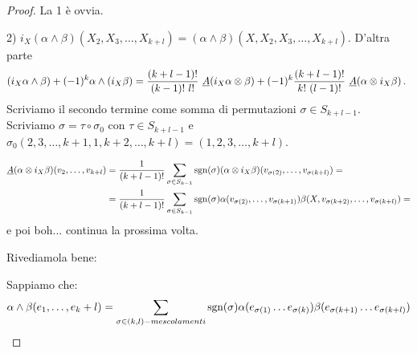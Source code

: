\begin{proof}
	La 1 è ovvia.
	
	2) $i_X(\alpha \wedge \beta) (X_2,X_3,\ldots,X_{k+l}) = (\alpha\wedge\beta) (X, X_2,X_3,\ldots,X_{k+l})$.
	D'altra parte
	\begin{equation*}
	(i_X\alpha\wedge \beta) + (-1)^k \alpha \wedge (i_X\beta) = \frac{(k+l-1)!}{(k-1)!\ l!}\ \antisimm (i_X\alpha \otimes \beta) + (-1)^k \frac{(k+l-1)!}{k!\ (l-1)!} \ \antisimm (\alpha \otimes i_X\beta) \punto
	\end{equation*}
	Scriviamo il secondo termine come somma di permutazioni $\sigma \in S_{k+l-1}$. Scriviamo $\sigma = \tau \circ \sigma_0$ con $\tau \in S_{k+l-1}$ e $\sigma_0(2,3,\ldots, k+1, 1, k+2, \ldots, k+l) = (1,2,3,\ldots, k+l)$.
	
	\begin{align*}
		\antisimm (\alpha \otimes i_X\beta) (v_2,\ldots,v_{k+l}) &= \frac 1{(k+l-1)!} \sum_{\sigma\in S_{k-1}}\sgn(\sigma) (\alpha \otimes i_X\beta) (v_{\sigma(2)},\ldots,v_{\sigma(k+l)})=\\
		&= \frac 1{(k+l-1)!} \sum_{\sigma\in S_{k-1}}\sgn(\sigma) \alpha(v_{\sigma(2)},\ldots,v_{\sigma(k+1)})\beta(X,v_{\sigma(k+2)},\ldots,v_{\sigma(k+l)})=
	\end{align*}
	e poi boh... continua la prossima volta.
	
	Rivediamola bene:
	
	Sappiamo che:
	\begin{equation*}
		\alpha\wedge\beta (\seqb e{k+l},) = \sum_{\sigma \in (k,l)-mescolamenti} \sgn(\sigma) \alpha(e_{\sigma(1)}\ldots e_{\sigma(k)}) \beta(e_{\sigma(k+1)}\ldots e_{\sigma(k+l)})
	\end{equation*}
	

\end{proof}
